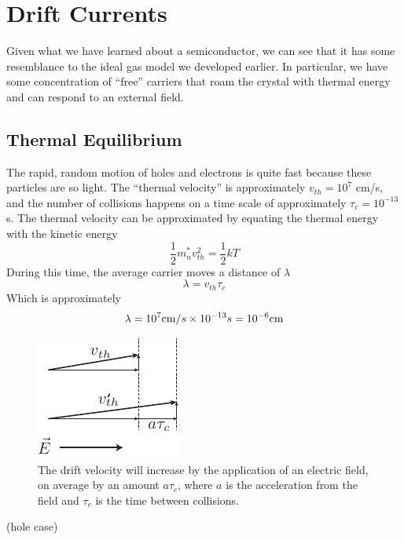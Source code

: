 \section{Drift Currents}
Given what we have learned about a semiconductor, we can see that it has some resemblance to the ideal gas model we developed earlier.  In particular, we have some concentration of “free” carriers that roam the crystal with thermal energy and can respond to an external field.  
\subsection{Thermal Equilibrium}
The rapid, random motion of holes and electrons is quite fast because these particles are so light.  The “thermal velocity” is approximately $v_{th} = 10^7$ cm/s, and the number of collisions happens on a time scale of approximately $\tau_c = 10^{-13}$s.  The thermal velocity can be approximated by equating the thermal energy with the kinetic energy
    \begin{equation}
        {\frac{1}{2}}m_n^*v_{th}^2 = {\frac{1}{2}}kT
    \end{equation}
During this time, the average carrier moves a distance of $\lambda$
    \begin{equation}
        \lambda = {v_{th}}{\tau _c}
    \end{equation}
Which is approximately
    \begin{equation}
        \lambda = {10^7}{\rm{cm}}/s \times {10^{ - 13}}s = {10^{ - 6}}{\rm{cm}}
    \end{equation}
\begin{figure}[tb]
\centering
\includegraphics[width=.3\columnwidth]{drift_field}
\caption{The drift velocity will increase by the application of an electric field, on average by an amount $a \tau_c$, where $a$ is the acceleration from the field and $\tau_c$ is the time between collisions.}
\label{fig:drift_field}
\end{figure}
(hole case)
